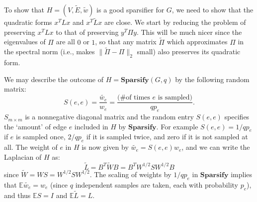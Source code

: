 \documentclass[11pt]{article}
\newcommand{\E}{\mathbb{E}}
\begin{document}
To show that $H=(V,\tilde{E},\tilde{w})$ is a good sparsifier for $G$, we need to show that the
quadratic forms $x^TLx$ and
$x^T\tilde{L}x$ are close. We start by reducing the problem of preserving $x^TLx$ to that of
preserving $y^T\Pi y$.  This will be much nicer since the eigenvalues of $\Pi$
are all $0$ or $1$, so that any matrix $\tilde{\Pi}$ which approximates $\Pi$ in
the spectral norm (i.e., makes $\|\tilde{\Pi}-\Pi\|_2$ small) also preserves its
quadratic form.

We may describe the outcome of $H=\mathbf{Sparsify}(G,q)$ by
the following random matrix:
\begin{equation}\label{defS} S(e,e)=\frac{\tilde{w_e}}{w_e}=
\frac{\textrm{(\# of times $e$ is sampled)}}{qp_e}.\end{equation}
$S_{m\times m}$ is a nonnegative diagonal matrix and the random entry $S(e,e)$ specifies the `amount' of edge
$e$ included in $H$ by $\mathbf{Sparsify}$. For example $S(e,e)=1/qp_e$ if $e$
is sampled once, $2/qp_e$ if it is sampled twice, and zero if it is not sampled
at all. 
The weight of $e$ in $H$ is now given by $\tilde{w_e}=S(e,e)w_e$, and we
can write the Laplacian of $H$ as:
\[ \tilde{L}=B^T\tilde{W}B=B^TW^{1/2}SW^{1/2}B\] since
$\tilde{W}=WS=W^{1/2}SW^{1/2}$.  The scaling of weights by $1/qp_e$ in $\mathbf{Sparsify}$ implies that $\E
\tilde{w_e}=w_e$ (since $q$ independent samples are taken, each with probability
$p_e$), and thus $\E S=I$ and $\E \tilde{L}=L$. 
\end{document}
